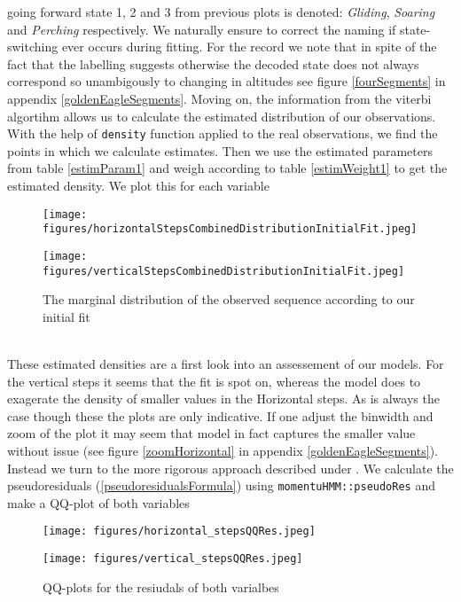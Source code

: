 going forward state 1, 2 and 3 from previous plots is denoted: \textit{Gliding}, \textit{Soaring} and \textit{Perching} respectively. We naturally ensure to correct the naming if state-switching ever occurs during fitting. For the record we note that in spite of the fact that the labelling suggests otherwise the decoded state does not always correspond so unambigously to changing in altitudes see figure \ref{fourSegments} in appendix \ref{goldenEagleSegments}.
Moving on, the information from the viterbi algortihm allows us to calculate the estimated distribution of our observations. With the help of \texttt{density} function \cite{RLang} applied to the real observations, we find the points in which we calculate estimates. Then we use the estimated parameters from table \ref{estimParam1} and weigh according to table \ref{estimWeight1} to get the estimated density. We plot this for each variable
\begin{figure}[h]
    \centering
    \begin{minipage}[b]{0.49\textwidth}
      \texttt{[image: figures/horizontalStepsCombinedDistributionInitialFit.jpeg]}
    \end{minipage}
    \hfill
    \begin{minipage}[b]{0.49\textwidth}
      \texttt{[image: figures/verticalStepsCombinedDistributionInitialFit.jpeg]}
    \end{minipage}
    \caption{The marginal distribution of the observed sequence according to our initial fit}
    \label{combinedDensityPlotsInitialFit}
\end{figure}\\
These estimated densities are a first look into an assessement of our models. For the vertical steps it seems that the fit is spot on, whereas the model does to exagerate the density of smaller values in the Horizontal steps. As is always the case though these the plots are only indicative. If one adjust the binwidth and zoom of the plot it may seem that model in fact captures the smaller value without issue (see figure \ref{zoomHorizontal} in appendix \ref{goldenEagleSegments}). Instead we turn to the more rigorous approach described under . We calculate the pseudoresiduals (\ref{pseudoresidualsFormula}) using \texttt{momentuHMM::pseudoRes} and make a QQ-plot of both variables
\begin{figure}[h]
    \centering
    \begin{minipage}[b]{0.49\textwidth}
      \texttt{[image: figures/horizontal\_stepsQQRes.jpeg]}
    \end{minipage}
    \hfill
    \begin{minipage}[b]{0.49\textwidth}
      \texttt{[image: figures/vertical\_stepsQQRes.jpeg]}
    \end{minipage}
    \caption{QQ-plots for the resiudals of both varialbes}
    \label{combinedQQPlots}
\end{figure}\\

